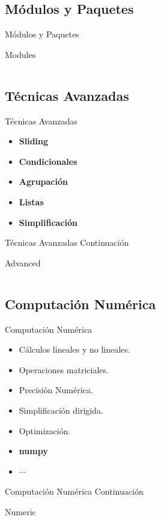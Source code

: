 \documentclass[usenames, dvipsnames, compress]{beamer}
\begin{document}
		\subsection{Módulos y Paquetes}
		\begin{frame}{Módulos y Paquetes}
			\begin{block}{Modules}
				\inputminted[xleftmargin=\parindent,linenos]{python}{codes/modules.py}
			\end{block}
		\end{frame}
		\subsection{Técnicas Avanzadas}
		\begin{frame}{Técnicas Avanzadas}
		\begin{itemize}[<+- | alert@ +>]
			\item \textbf{Sliding}
			\item \textbf{Condicionales}
			\item \textbf{Agrupación}
			\item \textbf{Listas}
			\item \textbf{Simplificación}
		\end{itemize}
		\end{frame}
		\begin{frame}{Técnicas Avanzadas Continuación}
			\begin{block}{Advanced}
				\inputminted[xleftmargin=\parindent,linenos]{python}{codes/advanced_techniques.py}
			\end{block}
		\end{frame}
		\subsection{Computación Numérica}
		\begin{frame}{Computación Numérica}
			\begin{itemize}[<+- | alert@ +>]
				\item Cálculos lineales y no lineales.
				\item Operaciones matriciales.
				\item Precisión Numérica.
				\item Simplificación dirigida.
				\item Optimización.
				\item \textbf{numpy}
				\item $\cdots$
			\end{itemize}
		\end{frame}
		\begin{frame}{Computación Numérica Continuación}
			\begin{block}{Numeric}
				\inputminted[xleftmargin=\parindent,linenos]{python}{codes/numerical_computation.py}
			\end{block}
		\end{frame}
\end{document}
